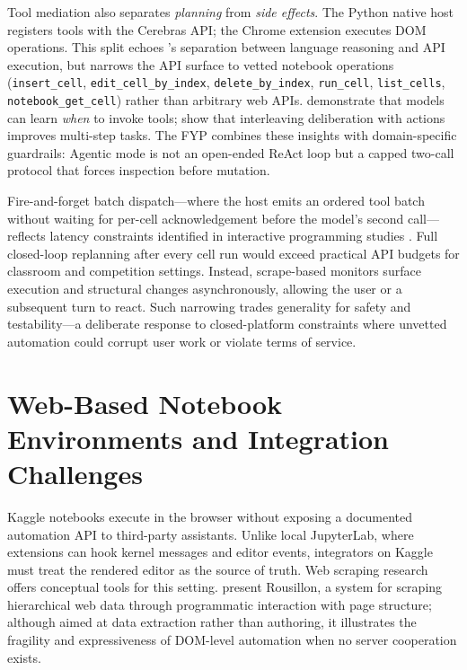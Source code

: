 Tool mediation also separates \emph{planning} from \emph{side effects}. The Python native host registers tools with the Cerebras \ac{API}; the Chrome extension executes \ac{DOM} operations. This split echoes \textcite{qin2024toolllm}'s separation between language reasoning and API execution, but narrows the API surface to vetted notebook operations (\texttt{insert\_cell}, \texttt{edit\_cell\_by\_index}, \texttt{delete\_by\_index}, \texttt{run\_cell}, \texttt{list\_cells}, \texttt{notebook\_get\_cell}) rather than arbitrary web APIs. \textcite{schick2023toolformer} demonstrate that models can learn \emph{when} to invoke tools; \textcite{yao2023react} show that interleaving deliberation with actions improves multi-step tasks. The FYP combines these insights with domain-specific guardrails: Agentic mode is not an open-ended ReAct loop but a capped two-call protocol that forces inspection before mutation.

Fire-and-forget batch dispatch---where the host emits an ordered tool batch without waiting for per-cell acknowledgement before the model's second call---reflects latency constraints identified in interactive programming studies \parencite{mozannar2024reading}. Full closed-loop replanning after every cell run would exceed practical \ac{API} budgets for classroom and competition settings. Instead, scrape-based monitors surface execution and structural changes asynchronously, allowing the user or a subsequent turn to react. Such narrowing trades generality for safety and testability---a deliberate response to closed-platform constraints where unvetted automation could corrupt user work or violate terms of service.

\section{Web-Based Notebook Environments and Integration Challenges}
\label{sec:lit-web-integration}

Kaggle notebooks execute in the browser without exposing a documented automation \ac{API} to third-party assistants. Unlike local JupyterLab, where extensions can hook kernel messages and editor events, integrators on Kaggle must treat the rendered editor as the source of truth. Web scraping research offers conceptual tools for this setting. \textcite{chasins2018roussillon} present Rousillon, a system for scraping hierarchical web data through programmatic interaction with page structure; although aimed at data extraction rather than authoring, it illustrates the fragility and expressiveness of DOM-level automation when no server cooperation exists.

